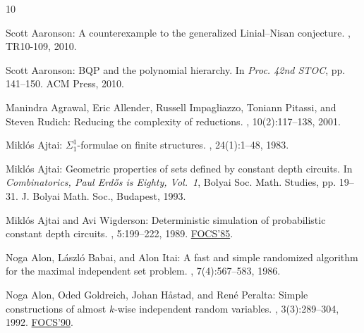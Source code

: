 \documentclass[11pt]{article}
\numberwithin{equation}{section}
\theoremstyle{definition}
\theoremstyle{plain}
\theoremstyle{plain}
\begin{document}
\tocrefpdfbookmark
\begin{thebibliography}{10}

{\sc Scott Aaronson}: A counterexample to the generalized {L}inial--{N}isan
  conjecture.
, TR10-109, 2010.

{\sc Scott Aaronson}: {{\sf BQP}} and the polynomial hierarchy.
\newblock In {\em Proc. 42nd STOC}, pp. 141--150. ACM Press, 2010.
\newblock [\epfmtdoi{10.1145/1806689.1806711}]

{\sc Manindra Agrawal, Eric Allender, Russell Impagliazzo, Toniann Pitassi, and
  Steven Rudich}: Reducing the complexity of reductions.
, 10(2):117--138, 2001.
\newblock [\epfmtdoi{10.1007/s00037-001-8191-1}]

{\sc Mikl{\'o}s Ajtai}: {$\Sigma_1^1$}-formulae on finite structures.
, 24(1):1--48, 1983.
\newblock [\epfmtdoi{10.1016/0168-0072(83)90038-6}]

{\sc Mikl\'os Ajtai}: Geometric properties of sets defined by constant depth
  circuits.
\newblock In {\em Combinatorics, {P}aul {E}rd{\H o}s is Eighty, {V}ol.\ 1},
  Bolyai Soc. Math. Studies, pp. 19--31. J. Bolyai Math. Soc., Budapest, 1993.

{\sc Mikl\'os Ajtai and Avi Wigderson}: Deterministic simulation of
  probabilistic constant depth circuits.
, 5:199--222, 1989.
\newblock \prelim \href{https://doi.org/10.1109/SFCS.1985.19}{FOCS'85}.

{\sc Noga Alon, L\'{a}szl\'{o} Babai, and Alon Itai}: A fast and simple
  randomized algorithm for the maximal independent set problem.
, 7(4):567--583, 1986.
\newblock [\epfmtdoi{10.1016/0196-6774(86)90019-2}]

{\sc Noga Alon, Oded Goldreich, Johan H{\aa}stad, and Ren{\'e} Peralta}: Simple
  constructions of almost {$k$}-wise independent random variables.
, 3(3):289--304, 1992.
\newblock \prelim \href{https://doi.org/10.1109/FSCS.1990.89575}{FOCS'90}.


\end{thebibliography}
\end{document}
